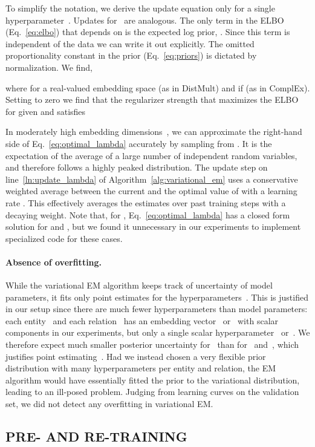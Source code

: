 \documentclass[letterpage]{article}
\begin{document}
To simplify the notation, we derive the update equation only for a single hyperparameter~.
Updates for~ are analogous.
The only term in the ELBO (Eq.~\ref{eq:elbo}) that depends on  is the expected log prior, .
Since this term is independent of the data we can write it out explicitly.
The omitted proportionality constant in the prior (Eq.~\ref{eq:priors}) is dictated by normalization.
We find,

where  for a real-valued embedding space  (as in DistMult) and  if  (as in ComplEx).
Setting  to zero we find that the regularizer strength  that maximizes the ELBO for given  and  satisfies


In moderately high embedding dimensions~, we can approximate the right-hand side of Eq.~\ref{eq:optimal_lambda} accurately by sampling from .
It is the expectation of the average of a large number of independent random variables, and therefore follows a highly peaked distribution.
The update step on line~\ref{ln:update_lambda} of Algorithm~\ref{alg:variational_em} uses a conservative weighted average between the current and the optimal value of  with a learning rate .
This effectively averages the estimates over past training steps with a decaying weight.
Note that, for , Eq.~\ref{eq:optimal_lambda} has a closed form solution for  and , but we found it unnecessary in our experiments to implement specialized code for these cases.

\paragraph{Absence of overfitting.}
While the variational EM algorithm keeps track of uncertainty of model parameters, it fits only point estimates for the hyperparameters~.
This is justified in our setup since there are much fewer hyperparameters than model parameters:
each entity~ and each relation~ has an embedding vector~ or~ with  scalar components in our experiments, but only a single scalar hyperparameter~ or~.
We therefore expect much smaller posterior uncertainty for~ than for~ and~, which justifies point estimating~.
Had we instead chosen a very flexible prior distribution with many hyperparameters per entity and relation, the EM algorithm would have essentially fitted the prior to the variational distribution, leading to an ill-posed problem.
Judging from learning curves on the validation set, we did not detect any overfitting in variational EM.


\subsection{PRE- AND RE-TRAINING}
\label{sec:algorithm_phases}
\end{document}
